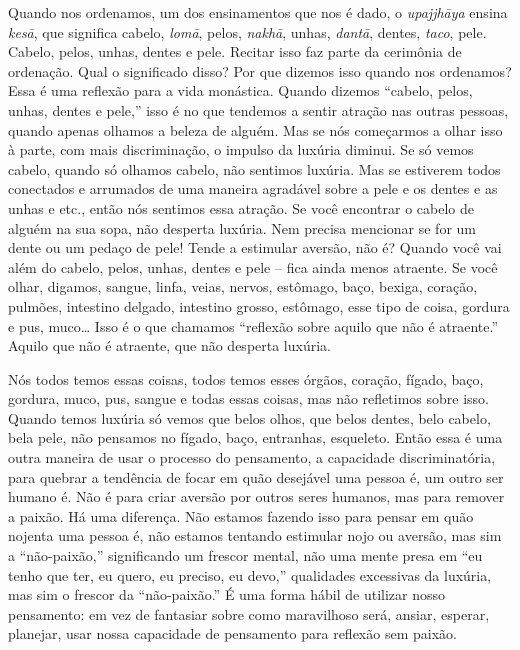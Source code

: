 Quando nos ordenamos, um dos ensinamentos que nos é dado, o
\textit{upajjhāya} ensina \textit{kesā}, que significa cabelo,
\textit{lomā}, pelos, \textit{nakhā}, unhas, \textit{dantā},
dentes, \textit{taco}, pele. Cabelo, pelos, unhas, dentes e pele.
Recitar isso faz parte da cerimônia de ordenação. Qual o significado
disso? Por que dizemos isso quando nos ordenamos? Essa é uma reflexão
para a vida monástica. Quando dizemos “cabelo, pelos, unhas, dentes e
pele,” isso é no que tendemos a sentir atração nas outras pessoas,
quando apenas olhamos a beleza de alguém. Mas se nós começarmos a olhar
isso à parte, com mais discriminação, o impulso da luxúria diminui. Se
só vemos cabelo, quando só olhamos cabelo, não sentimos luxúria. Mas se
estiverem todos conectados e arrumados de uma maneira agradável sobre a
pele e os dentes e as unhas e etc., então nós sentimos essa atração. Se
você encontrar o cabelo de alguém na sua sopa, não desperta luxúria.
Nem precisa mencionar se for um dente ou um pedaço de pele! Tende a
estimular aversão, não é? Quando você vai além do cabelo, pelos, unhas,
dentes e pele – fica ainda menos atraente. Se você olhar, digamos,
sangue, linfa, veias, nervos, estômago, baço, bexiga, coração, pulmões,
intestino delgado, intestino grosso, estômago, esse tipo de coisa,
gordura e pus, muco… Isso é o que chamamos “reflexão sobre aquilo que
não é atraente.” Aquilo que não é atraente, que não desperta luxúria. 

Nós todos temos essas coisas, todos temos esses órgãos, coração,
fígado, baço, gordura, muco, pus, sangue e todas essas coisas, mas não
refletimos sobre isso. Quando temos luxúria só vemos que belos olhos,
que belos dentes, belo cabelo, bela pele, não pensamos no fígado, baço,
entranhas, esqueleto. Então essa é uma outra maneira de usar o processo
do pensamento, a capacidade discriminatória, para quebrar a tendência
de focar em quão desejável uma pessoa é, um outro ser humano é. Não é
para criar aversão por outros seres humanos, mas para remover a paixão.
Há uma diferença. Não estamos fazendo isso para pensar em quão nojenta
uma pessoa é, não estamos tentando estimular nojo ou aversão, mas sim a
“não-paixão,” significando um frescor mental, não uma mente presa em
“eu tenho que ter, eu quero, eu preciso, eu devo,” qualidades
excessivas da luxúria, mas sim o frescor da “não-paixão.” É uma forma
hábil de utilizar nosso pensamento: em vez de fantasiar sobre como
maravilhoso será, ansiar, esperar, planejar, usar nossa capacidade de
pensamento para reflexão sem paixão. 

